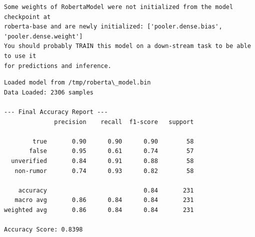 \documentclass[11pt]{article}
\begin{document}
    \begin{Verbatim}[commandchars=\\\{\}]
Some weights of RobertaModel were not initialized from the model checkpoint at
roberta-base and are newly initialized: ['pooler.dense.bias',
'pooler.dense.weight']
You should probably TRAIN this model on a down-stream task to be able to use it
for predictions and inference.
    \end{Verbatim}

    \begin{Verbatim}[commandchars=\\\{\}]
Loaded model from /tmp/roberta\_model.bin
Data Loaded: 2306 samples

--- Final Accuracy Report ---
              precision    recall  f1-score   support

        true       0.90      0.90      0.90        58
       false       0.95      0.61      0.74        57
  unverified       0.84      0.91      0.88        58
   non-rumor       0.74      0.93      0.82        58

    accuracy                           0.84       231
   macro avg       0.86      0.84      0.84       231
weighted avg       0.86      0.84      0.84       231

Accuracy Score: 0.8398
    \end{Verbatim}
\end{document}
